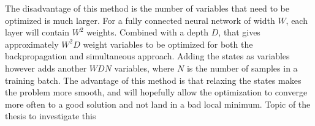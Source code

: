 The disadvantage of this method is the number of variables that need to be optimized is much larger. For a fully connected neural network of width $W$, each layer will contain $W^2$ weights. Combined with a depth $D$, that gives approximately $W^2D$ weight variables to be optimized for both the backpropagation and simultaneous approach. Adding the states as variables however adds another $WDN$ variables, where $N$ is the number of samples in a training batch. The advantage of this method is that relaxing the states makes the problem more smooth, and will hopefully allow the optimization to converge more often to a good solution and not land in a bad local minimum. Topic of the thesis to investigate this

